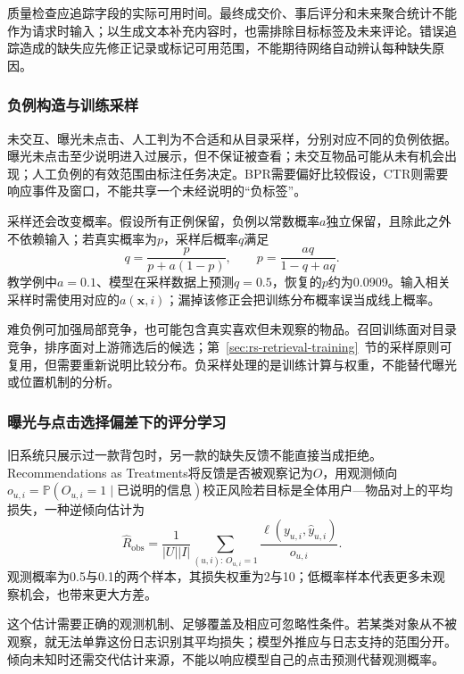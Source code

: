 质量检查应追踪字段的实际可用时间。最终成交价、事后评分和未来聚合统计不能作为请求时输入；以生成文本补充内容时，也需排除目标标签及未来评论。错误追踪造成的缺失应先修正记录或标记可用范围，不能期待网络自动辨认每种缺失原因。

\subsubsection{负例构造与训练采样}
\label{sec:rs-ranking-negatives}

未交互、曝光未点击、人工判为不合适和从目录采样，分别对应不同的负例依据。曝光未点击至少说明进入过展示，但不保证被查看；未交互物品可能从未有机会出现；人工负例的有效范围由标注任务决定。BPR需要偏好比较假设，CTR则需要响应事件及窗口，不能共享一个未经说明的“负标签”。

采样还会改变概率。假设所有正例保留，负例以常数概率$a$独立保留，且除此之外不依赖输入；若真实概率为$p$，采样后概率$q$满足
\[
 q=\frac{p}{p+a(1-p)},\qquad
 p=\frac{aq}{1-q+aq}.
\]
教学例中$a=0.1$、模型在采样数据上预测$q=0.5$，恢复的$p$约为0.0909。输入相关采样时需使用对应的$a(\bm x,i)$；漏掉该修正会把训练分布概率误当成线上概率。

难负例可加强局部竞争，也可能包含真实喜欢但未观察的物品。召回训练面对目录竞争，排序面对上游筛选后的候选；第~\ref{sec:rs-retrieval-training}~节的采样原则可复用，但需要重新说明比较分布。负采样处理的是训练计算与权重，不能替代曝光或位置机制的分析。

\subsubsection{曝光与点击选择偏差下的评分学习}
\label{sec:rs-selection-bias}

旧系统只展示过一款背包时，另一款的缺失反馈不能直接当成拒绝。Recommendations as Treatments将反馈是否被观察记为$O$，用观测倾向$o_{u,i}=\mathbb P(O_{u,i}=1\mid\text{已说明的信息})$校正风险若目标是全体用户—物品对上的平均损失，一种逆倾向估计为
\begin{equation}
 \widehat R_{\mathrm{obs}}
 =\frac1{|U||I|}
   \sum_{(u,i):\,O_{u,i}=1}
    \frac{\ell(y_{u,i},\widehat y_{u,i})}{o_{u,i}}.
 \label{eq:rs-observed-risk}
\end{equation}
观测概率为0.5与0.1的两个样本，其损失权重为2与10；低概率样本代表更多未观察机会，也带来更大方差。

这个估计需要正确的观测机制、足够覆盖及相应可忽略性条件。若某类对象从不被观察，就无法单靠这份日志识别其平均损失；模型外推应与日志支持的范围分开。倾向未知时还需交代估计来源，不能以响应模型自己的点击预测代替观测概率。

